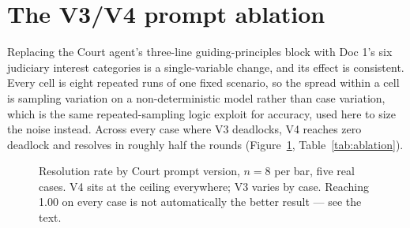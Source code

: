 \section{The V3/V4 prompt ablation}
\label{sec:ablation}

Replacing the Court agent's three-line guiding-principles block with Doc 1's six
judiciary interest categories is a single-variable change, and its effect is
consistent. Every cell is eight repeated runs of one fixed scenario, so the spread
within a cell is sampling variation on a non-deterministic model rather than case
variation, which is the same repeated-sampling logic
\citet{wang2023selfconsistency} exploit for accuracy, used here to size the noise
instead. Across every case where V3 deadlocks, V4 reaches zero
deadlock and resolves in roughly half the rounds (Figure~\ref{fig:ablation},
Table~\ref{tab:ablation}).

\begin{figure}[htbp]
\centering
{}
\vspace{4mm}
\caption[V3 vs V4 resolution rates]{Resolution rate by Court prompt version,
$n=8$ per bar, five real cases. V4 sits at the ceiling everywhere; V3 varies by
case. Reaching 1.00 on every case is not automatically the better result --- see
the text.}
\label{fig:ablation}
\end{figure}

